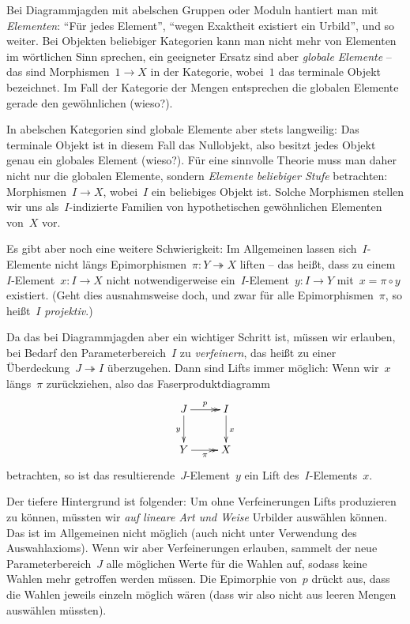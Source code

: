 \documentclass{uebblatt}
\begin{document}

Bei Diagrammjagden mit abelschen Gruppen oder Moduln hantiert man mit
\emph{Elementen}: "`Für jedes Element"', "`wegen Exaktheit existiert ein
Urbild"', und so weiter. Bei Objekten beliebiger Kategorien kann man nicht mehr von
Elementen im wörtlichen Sinn sprechen, ein geeigneter Ersatz sind aber
\emph{globale Elemente} -- das sind Morphismen~$1 \to X$ in der Kategorie,
wobei~$1$ das terminale Objekt bezeichnet. Im Fall der Kategorie der Mengen
entsprechen die globalen Elemente gerade den gewöhnlichen (wieso?).

In abelschen Kategorien sind globale Elemente aber stets langweilig: Das
terminale Objekt ist in diesem Fall das Nullobjekt, also besitzt jedes Objekt
genau ein globales Element (wieso?). Für eine sinnvolle Theorie muss man daher
nicht nur die globalen Elemente, sondern \emph{Elemente beliebiger Stufe}
betrachten: Morphismen~$I \to X$, wobei~$I$ ein beliebiges Objekt ist. Solche
Morphismen stellen wir uns als~$I$-indizierte Familien von hypothetischen
gewöhnlichen Elementen von~$X$ vor.

Es gibt aber noch eine weitere Schwierigkeit: Im Allgemeinen lassen
sich~$I$-Elemente nicht längs Epimorphismen~$\pi : Y \twoheadrightarrow X$
liften -- das heißt, dass zu einem~$I$-Element~$x : I \to X$
nicht notwendigerweise ein~$I$-Element~$y : I \to Y$ mit~$x = \pi \circ y$
existiert. (Geht dies ausnahmsweise doch, und zwar für alle Epimorphismen~$\pi$, so
heißt~$I$ \emph{projektiv}.)

Da das bei Diagrammjagden aber ein wichtiger Schritt ist, müssen wir erlauben,
bei Bedarf den Parameterbereich~$I$ zu \emph{verfeinern}, das heißt zu einer
Überdeckung~$J \twoheadrightarrow I$ überzugehen. Dann sind Lifts immer
möglich: Wenn wir~$x$ längs~$\pi$ zurückziehen, also das
Faserproduktdiagramm
\[ \xymatrix{
  J \ar@{->>}[r]^p \ar[d]_y & I \ar[d]^x \\
  Y \ar@{->>}[r]_\pi & X
} \]
betrachten, so ist das resultierende~$J$-Element~$y$ ein Lift
des~$I$-Elements~$x$.

Der tiefere Hintergrund ist folgender: Um ohne Verfeinerungen
Lifts produzieren zu können, müssten wir \emph{auf lineare Art und Weise}
Urbilder auswählen können. Das ist im Allgemeinen nicht möglich (auch nicht
unter Verwendung des Auswahlaxioms). Wenn wir aber Verfeinerungen erlauben,
sammelt der neue Parameterbereich~$J$ alle möglichen Werte für die Wahlen auf,
sodass keine Wahlen mehr getroffen werden müssen. Die Epimorphie von~$p$ drückt
aus, dass die Wahlen jeweils einzeln möglich wären (dass wir also nicht aus
leeren Mengen auswählen müssten).
\end{document}
